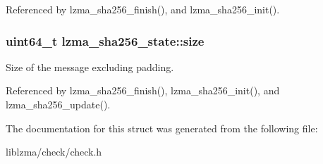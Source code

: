 Referenced by lzma\-\_\-sha256\-\_\-finish(), and lzma\-\_\-sha256\-\_\-init().

\subsubsection[{size}]{\setlength{\rightskip}{0pt plus 5cm}uint64\-\_\-t lzma\-\_\-sha256\-\_\-state\-::size}\label{structlzma__sha256__state_a62337a1a0d34a9702ab4a438da383794}


Size of the message excluding padding. 



Referenced by lzma\-\_\-sha256\-\_\-finish(), lzma\-\_\-sha256\-\_\-init(), and lzma\-\_\-sha256\-\_\-update().



The documentation for this struct was generated from the following file\-:\begin{DoxyCompactItemize}
\item 
liblzma/check/check.\-h\end{DoxyCompactItemize}
